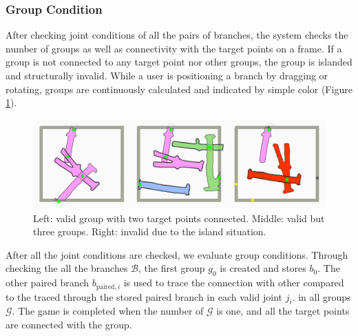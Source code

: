 \subsubsection*{Group Condition}

After checking joint conditions of all the pairs of branches, the system checks the number of groups as well as connectivity with the target points on a frame.
If a group is not connected to any target point nor other groups, the group is islanded and structurally invalid.
While a user is positioning a branch by dragging or rotating, groups are continuously calculated and indicated by simple color (Figure \ref{fig:group}).

\begin{figure}[ht]
  \begin{center}
    \includegraphics[width = 0.4\paperwidth]{images/interface/groups.jpg}
    \caption{Left: valid group with two target points connected. Middle: valid but three groups. Right: invalid due to the island situation. }
    \label{fig:group}
  \end{center}
\end{figure}


After all the joint conditions are checked, we evaluate group conditions.
Through checking the all the branches $\mathcal{B}$, the first group $g_0$ is created and stores $b_0$.
The other paired branch $b_{\text{paired},i}$ is used to trace the connection with other  compared to the  traced through the stored paired branch  in each valid joint $j_i$.
 in all groups $\mathcal{G}$.
The game is completed when the number of $\mathcal{G}$ is one, and all the target points are connected with the group.

